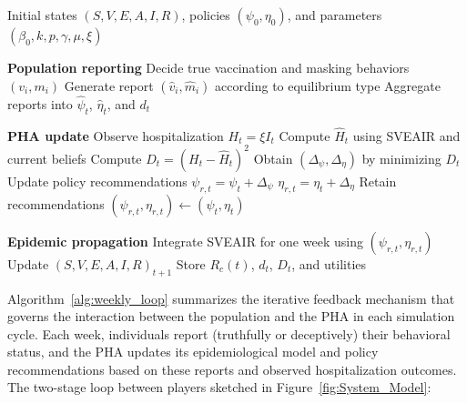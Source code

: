 \documentclass[sigconf,review]{acmart}
\begin{document}
\begin{algorithm}[tbp]
\small
\caption{Weekly Population--PHA Interaction Loop}
\label{alg:weekly_loop}
\begin{algorithmic}[1]
\Require Initial states $(S,V,E,A,I,R)$,
    policies $(\psi_0,\eta_0)$, and parameters
    $(\beta_0,k,p,\gamma,\mu,\xi)$

    \State \textbf{Population reporting}
        \State Decide true vaccination and masking
            behaviors $(v_i,m_i)$
        \State Generate report $(\hat v_i,\hat m_i)$
            according to equilibrium type
    \EndFor
    \State Aggregate reports into
        $\hat\psi_t$, $\hat\eta_t$, and $d_t$
    \Statex

    \State \textbf{PHA update}
    \State Observe hospitalization $H_t=\xi I_t$
    \State Compute $\hat H_t$ using SVEAIR
        and current beliefs
    \State Compute $D_t=(H_t-\hat H_t)^2$
        \State Obtain $(\Delta_\psi,\Delta_\eta)$
            by minimizing $D_t$
        \State Update policy recommendations
        \Statex \hspace{\algorithmicindent}
            $\psi_{r,t}=\psi_t+\Delta_\psi$
        \Statex \hspace{\algorithmicindent}
            $\eta_{r,t}=\eta_t+\Delta_\eta$
    \Else
        \State Retain recommendations
        \Statex \hspace{\algorithmicindent}
            $(\psi_{r,t},\eta_{r,t})
            \gets(\psi_t,\eta_t)$
    \EndIf
    \Statex

    \State \textbf{Epidemic propagation}
    \State Integrate SVEAIR for one week
        using $(\psi_{r,t},\eta_{r,t})$
    \State Update $(S,V,E,A,I,R)_{t+1}$
    \State Store $R_c(t)$, $d_t$, $D_t$,
        and utilities
\EndFor
\end{algorithmic}
\end{algorithm}

Algorithm~\ref{alg:weekly_loop} summarizes the iterative feedback mechanism that governs the interaction between the population and the PHA in each simulation cycle. Each week, individuals report (truthfully or deceptively) their behavioral status, and the PHA updates its epidemiological model and policy recommendations based on these reports and observed hospitalization outcomes. The two-stage loop between players sketched in Figure~\ref{fig:System_Model}:
\end{document}
